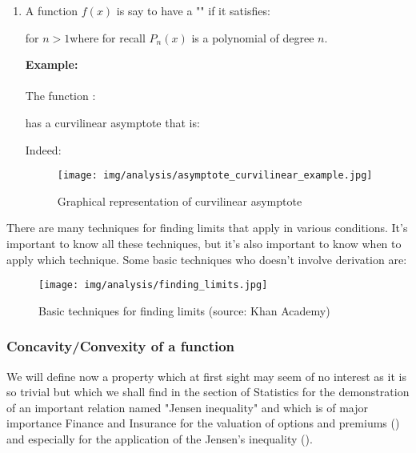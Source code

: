\begin{enumerate}
\begin{enumerate}
			\item A function $f(x)$ is say to have a "" if it satisfies:
			
			for $n>1 $where for recall $P_n(x)$ is a polynomial of degree $n$.
			\begin{tcolorbox}[colframe=black,colback=white,sharp corners]
			\textbf{{\Large {}}Example:}\\\\
			The function :
			
			has a curvilinear asymptote that is:
			
			Indeed:
			
			 \begin{figure}[H]
				\centering
				\texttt{[image: img/analysis/asymptote\_curvilinear\_example.jpg]}
				\caption[]{Graphical representation of curvilinear asymptote}
			\end{figure}
			\end{tcolorbox}
		\end{enumerate}
	\end{enumerate}
	There are many techniques for finding limits that apply in various conditions. It's important to know all these techniques, but it's also important to know when to apply which technique. Some basic techniques who doesn't involve derivation are:
	\begin{figure}[H]
		\centering
		\texttt{[image: img/analysis/finding\_limits.jpg]}
		\caption[Basic techniques for finding limits]{Basic techniques for finding limits (source: Khan Academy)}
	\end{figure}
	
	
	\pagebreak
	\subsubsection{Concavity/Convexity of a function}
	We will define now a property which at first sight may seem of no interest as it is so trivial but which we shall find in the section of Statistics for the demonstration of an important relation named "Jensen inequality" and which is of major importance Finance and Insurance for the valuation of options and premiums () and especially for the application of the Jensen's inequality ().

